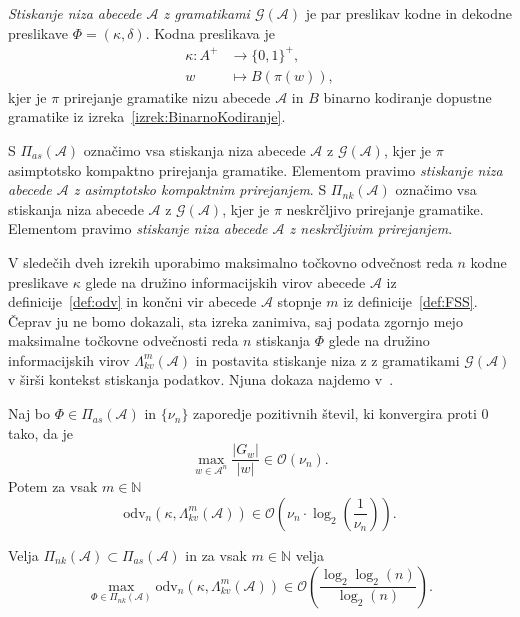 \documentclass[fin1, tisk]{fmfdelo}
\providecommand{\abs}[1]{\left\lvert #1 \right\rvert}
\newcommand{\N}{\mathbb{N}}
\newcommand{\A}{\mathcal{A}}
\newcommand{\G}{\mathcal{G}}
\theoremstyle{definition}
\begin{document}
\begin{definicija}
    \emph{Stiskanje niza abecede $\A$ z gramatikami $\G(\A)$} je 
    par preslikav kodne in dekodne preslikave $\varPhi = (\kappa, \delta)$. Kodna preslikava je
    \begin{align*}
        \kappa \colon A^+ &\to \{ 0, 1\}^+,\\
        w &\mapsto B(\pi(w)),
    \end{align*}
    kjer je $\pi$ prirejanje gramatike nizu abecede $\A$ in
    $B$ binarno kodiranje dopustne gramatike iz izreka~\ref{izrek:BinarnoKodiranje}.
\end{definicija}

\begin{definicija}
    S $\varPi_{as}(\A)$ označimo vsa stiskanja niza abecede $\A$ z $\G(\A)$,
    kjer je $\pi$ asimptotsko kompaktno prirejanja gramatike. Elementom pravimo
    \emph{stiskanje niza abecede $\A$ z asimptotsko kompaktnim prirejanjem}.
    S $\varPi_{nk}(\A)$ označimo vsa stiskanja niza abecede $\A$ z $\G(\A)$,
    kjer je $\pi$ neskrčljivo prirejanje gramatike. Elementom pravimo
    \emph{stiskanje niza abecede $\A$ z neskrčljivim prirejanjem}.
\end{definicija}

V sledečih dveh izrekih uporabimo maksimalno točkovno odvečnost reda $n$ kodne preslikave 
$\kappa$ glede na družino informacijskih virov abecede $\A$ iz definicije~\ref{def:odv} in
končni vir abecede $\A$ stopnje $m$ iz definicije~\ref{def:FSS}. Čeprav ju ne bomo dokazali,
sta izreka zanimiva, saj podata zgornjo mejo maksimalne točkovne odvečnosti reda $n$ stiskanja 
$\varPhi$ glede na družino informacijskih virov $\Lambda_{kv}^m(\A)$ in postavita stiskanje niza 
z z gramatikami $\G(\A)$ v širši kontekst stiskanja podatkov. Njuna dokaza najdemo 
v~\cite{KiefferYang2000}.

\begin{izrek}
    Naj bo $\varPhi \in \varPi_{as}(\A)$ in $\{ \nu_n \}$ zaporedje pozitivnih števil,
    ki konvergira proti $0$ tako, da je
    \[
        \max_{w \in \A^n} \frac{\abs{G_w}}{\abs{w}} \in \mathcal{O}(\nu_n).
    \]
    Potem za vsak $m \in \N$
    \[
        \text{odv}_n \left( \kappa, \Lambda_{kv}^m(\A) \right) \in
        \mathcal{O} \left( \nu_n \cdot \log_2 \left( \frac{1}{\nu_n} \right) \right).
    \]
\end{izrek}

\begin{izrek}\label{izrek:RedKonvergenca}
    Velja $\varPi_{nk}(\A) \subset \varPi_{as}(\A)$ in za vsak $m \in \N$ velja 
    \[
        \max_{\varPhi \in \varPi_{nk}(\A)} \text{odv}_n \left( \kappa, \Lambda_{kv}^m(\A) \right) \in
        \mathcal{O} \left( \frac{\log_2 \log_2(n)}{\log_2(n)} \right).
    \]
\end{izrek}
\end{document}
